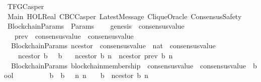 %
\begin{isabellebody}%
%
%
\isadelimtheory
%
\endisadelimtheory
%
\isatagtheory
{}\isamarkupfalse%
\ TFGCasper\isanewline
\isanewline
{}\ Main\ HOL{\isachardot}Real\ CBCCasper\ LatestMessage\ CliqueOracle\ ConsensusSafety\isanewline
\isanewline
{}%
\endisatagtheory
{\isafoldtheory}%
%
\isadelimtheory
\isanewline
%
\endisadelimtheory
\isanewline
\isanewline
\isanewline
\isanewline
\isanewline
\isanewline
{}\isamarkupfalse%
\ BlockchainParams\ {\isacharequal}\ Params\ {\isacharplus}\isanewline
\ \ \ genesis\ {\isacharcolon}{\isacharcolon}\ consensus{\isacharunderscore}value\isanewline
\ \ \isanewline
\ \ \ prev\ {\isacharcolon}{\isacharcolon}\ {\isachardoublequoteopen}consensus{\isacharunderscore}value\ {\isasymRightarrow}\ consensus{\isacharunderscore}value{\isachardoublequoteclose}\isanewline
\isanewline
\isanewline
{}\isamarkupfalse%
\ {\isacharparenleft}\ BlockchainParams{\isacharparenright}\ n{\isacharunderscore}cestor\ {\isacharcolon}{\isacharcolon}\ {\isachardoublequoteopen}consensus{\isacharunderscore}value\ {\isacharasterisk}\ nat\ {\isasymRightarrow}\ consensus{\isacharunderscore}value{\isachardoublequoteclose}\isanewline
\ \ \isanewline
\ \ \ \ {\isachardoublequoteopen}n{\isacharunderscore}cestor\ {\isacharparenleft}b{\isacharcomma}\ {}{\isacharparenright}\ {\isacharequal}\ b{\isachardoublequoteclose}\isanewline
\ \ {\isacharbar}\ {\isachardoublequoteopen}n{\isacharunderscore}cestor\ {\isacharparenleft}b{\isacharcomma}\ n{\isacharparenright}\ {\isacharequal}\ n{\isacharunderscore}cestor\ {\isacharparenleft}prev\ b{\isacharcomma}\ n{\isacharminus}{}{\isacharparenright}{\isachardoublequoteclose}\isanewline
\isanewline
\isanewline
{}\isamarkupfalse%
\ {\isacharparenleft}\ BlockchainParams{\isacharparenright}\ blockchain{\isacharunderscore}membership\ {\isacharcolon}{\isacharcolon}\ {\isachardoublequoteopen}consensus{\isacharunderscore}value\ {\isasymRightarrow}\ consensus{\isacharunderscore}value\ {\isasymRightarrow}\ bool{\isachardoublequoteclose}\ {\isacharparenleft}\ {\isachardoublequoteopen}{\isasymdownharpoonright}{\isachardoublequoteclose}\ {}{}{\isacharparenright}\isanewline
\ \ \isanewline
\ \ \ \ {\isachardoublequoteopen}b{}\ {\isasymdownharpoonright}\ b{}\ {\isacharequal}\ {\isacharparenleft}{\isasymexists}\ n{\isachardot}\ n\ {\isasymin}\ {\isasymnat}\ {\isasymand}\ b{}\ {\isacharequal}\ n{\isacharunderscore}cestor\ {\isacharparenleft}b{}{\isacharcomma}\ n{\isacharparenright}{\isacharparenright}{\isachardoublequoteclose}\isanewline

\end{isabellebody}
